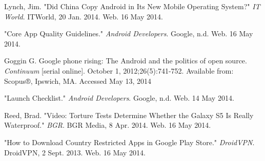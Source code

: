 \documentclass[conference]{IEEEtran}
\begin{document}
\begin{thebibliography}{1}



Lynch, Jim. "Did China Copy Android in Its New Mobile Operating System?" \textit{IT World}. ITWorld, 20 Jan. 2014. Web. 16 May 2014.

"Core App Quality Guidelines." \textit{Android Developers}. Google, n.d. Web. 16 May 2014.

Goggin G. Google phone rising: The Android and the politics of open source. \textit{Continuum} [serial online]. October 1, 2012;26(5):741-752. Available from: Scopus®, Ipswich, MA. Accessed May 13, 2014

"Launch Checklist." \textit{Android Developers}. Google, n.d. Web. 14 May 2014.

Reed, Brad. "Video: Torture Tests Determine Whether the Galaxy S5 Is Really Waterproof." \textit{BGR}. BGR Media, 8 Apr. 2014. Web. 16 May 2014.

"How to Download Country Restricted Apps in Google Play Store." \textit{DroidVPN}. DroidVPN, 2 Sept. 2013. Web. 16 May 2014.

\end{thebibliography}
\end{document}
